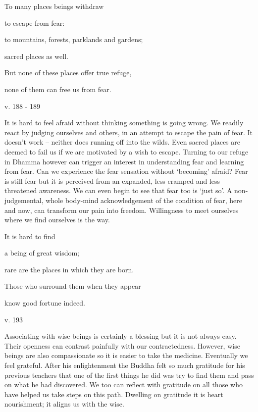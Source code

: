 \documentclass[a4paper,portrait,12pt]{article}
\begin{document}
To many places beings withdraw 


to escape from fear:


to mountains, forests, parklands and gardens; 


sacred places as well.


But none of these places offer true refuge,


none of them can free us from fear.





v. 188 - 189 





It is hard to feel afraid without thinking something is going wrong. We readily react by judging ourselves and others, in an attempt to escape the pain of fear. It doesn't work -- neither does running off into the wilds. Even sacred places are deemed to fail us if we are motivated by a wish to escape. Turning to our refuge in Dhamma however can trigger an interest in understanding fear and learning from fear. Can we experience the fear sensation without `becoming' afraid? Fear is still fear but it is perceived from an expanded, less cramped and less threatened awareness. We can even begin to see that fear too is `just so'. A non-judgemental, whole body-mind acknowledgement of the condition of fear, here and now, can transform our pain into freedom. Willingness to meet ourselves where we find ourselves is the way.














It is hard to find 


a being of great wisdom;


rare are the places in which they are born.


Those who surround them when they appear


know good fortune indeed.





v. 193





Associating with wise beings is certainly a blessing but it is not always easy. Their openness can contrast painfully with our contractedness. However, wise beings are also compassionate so it is easier to take the medicine. Eventually we feel grateful. After his enlightenment the Buddha felt so much gratitude for his previous teachers that one of the first things he did was try to find them and pass on what he had discovered. We too can reflect with gratitude on all those who have helped us take steps on this path. Dwelling on gratitude it is heart nourishment; it aligns us with the wise.
\end{document}
